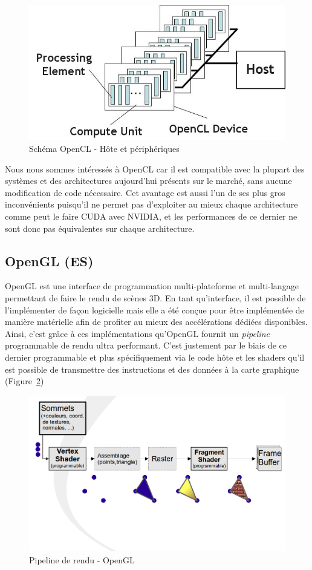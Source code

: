 \begin{figure}[H]
\centering
\includegraphics[width=0.5\linewidth]{images/opencl}
\caption{Schéma OpenCL - Hôte et périphériques\protect\footnotemark}
\label{fig:opencl}
\end{figure}


Nous nous sommes intéressés à OpenCL car il est compatible avec la plupart des systèmes et des architectures aujourd'hui présents sur le marché, sans aucune modification de code nécessaire. Cet avantage est aussi l'un de ses plus gros inconvénients puisqu'il ne permet pas d'exploiter au mieux chaque architecture comme peut le faire CUDA avec NVIDIA, et les performances de ce dernier ne sont donc pas équivalentes sur chaque architecture. %

\subsection{OpenGL (ES)}
OpenGL est une interface de programmation multi-plateforme et multi-langage permettant de faire le rendu de scènes 3D. En tant qu'interface, il est possible de l'implémenter de façon logicielle mais elle a été conçue pour être implémentée de manière matérielle afin de profiter au mieux des accélérations dédiées disponibles. Ainsi, c'est grâce à ces implémentations qu'OpenGL fournit un \emph{pipeline} programmable de rendu ultra performant. C'est justement par le biais de ce dernier programmable et plus spécifiquement via le code hôte et les shaders qu'il est possible de transmettre des instructions et des données à la carte graphique (Figure~\ref{fig:opengl:pipeline})

\begin{figure}[H]
\centering
\includegraphics[width=0.7\linewidth]{images/opengl-pipeline}
\caption{Pipeline de rendu - OpenGL\protect\footnotemark}
\label{fig:opengl:pipeline}
\end{figure}

